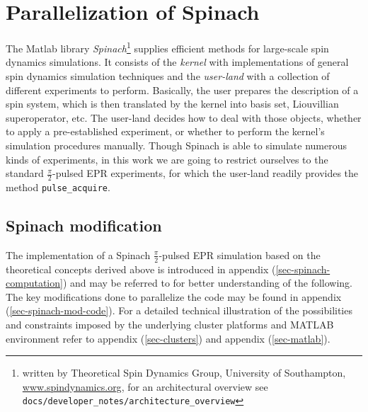 \documentclass[11.5pt,a4paper]{article}
\begin{document}
\section{Parallelization of Spinach}

The Matlab library \emph{Spinach}\footnote{written by Theoretical Spin Dynamics Group, University of Southampton, \url{www.spindynamics.org}, for an architectural overview see \verb$docs/developer_notes/architecture_overview$} supplies efficient methods for large-scale spin dynamics simulations. It consists of the \emph{kernel} with implementations of general spin dynamics simulation techniques and the \emph{user-land} with a collection of different experiments to perform. Basically, the user prepares the description of a spin system, which is then translated by the kernel into basis set, Liouvillian superoperator, etc. The user-land decides how to deal with those objects, whether to apply a pre-established experiment, or whether to perform the kernel's simulation procedures manually. Though Spinach is able to simulate numerous kinds of experiments, in this work we are going to restrict ourselves to the standard $\tfrac{\pi}{2}$-pulsed EPR experiments, for which the user-land readily provides the method \verb|pulse_acquire|. 

\subsection{Spinach modification}
The implementation of a Spinach $\tfrac{\pi}{2}$-pulsed EPR simulation based on the theoretical concepts derived above is introduced in appendix (\ref{sec-spinach-computation}) and may be referred to for better understanding of the following. The key modifications done to parallelize the code may be found in appendix (\ref{sec-spinach-mod-code}). For a detailed technical illustration of the possibilities and constraints imposed by the underlying cluster platforms and MATLAB environment refer to appendix (\ref{sec-clusters}) and appendix (\ref{sec-matlab}).
\end{document}
